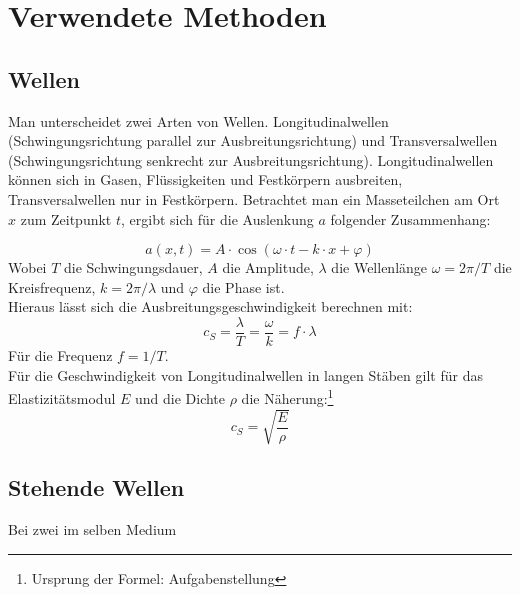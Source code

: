 \section{Verwendete Methoden}
\subsection{Wellen}
Man unterscheidet zwei Arten von Wellen. Longitudinalwellen (Schwingungsrichtung parallel zur Ausbreitungsrichtung) und Transversalwellen (Schwingungsrichtung senkrecht zur Ausbreitungsrichtung). Longitudinalwellen können sich in Gasen, Flüssigkeiten und Festkörpern ausbreiten, Transversalwellen nur in Festkörpern. Betrachtet man ein Masseteilchen am Ort $x$ zum Zeitpunkt $t$, ergibt sich für die Auslenkung $a$ folgender Zusammenhang:

\begin{equation}
a(x, t) = A \cdot \cos (\omega \cdot t - k \cdot x + \varphi)
\label{eq.wave}
\end{equation}
Wobei $T$ die Schwingungsdauer, $A$ die Amplitude, $\lambda$ die Wellenlänge $\omega = 2\pi /T$ die Kreisfrequenz, $k = 2\pi /\lambda$ und $\varphi$ die Phase ist.\\
Hieraus lässt sich die Ausbreitungsgeschwindigkeit berechnen mit:
\begin{equation}
c_S = \frac{\lambda}{T} = \frac{\omega}{k} = f \cdot \lambda
\label{eq:speed}
\end{equation}
Für die Frequenz $f = 1/T$.\\
Für die Geschwindigkeit von Longitudinalwellen in langen Stäben gilt für das Elastizitätsmodul $E$ und die Dichte $\rho$ die Näherung:\footnote{Ursprung der Formel: Aufgabenstellung}
\begin{equation}
c_S = \sqrt{\frac{E}{\rho}}
\label{eq:elast}
\end{equation}
\subsection{Stehende Wellen}
Bei zwei im selben Medium